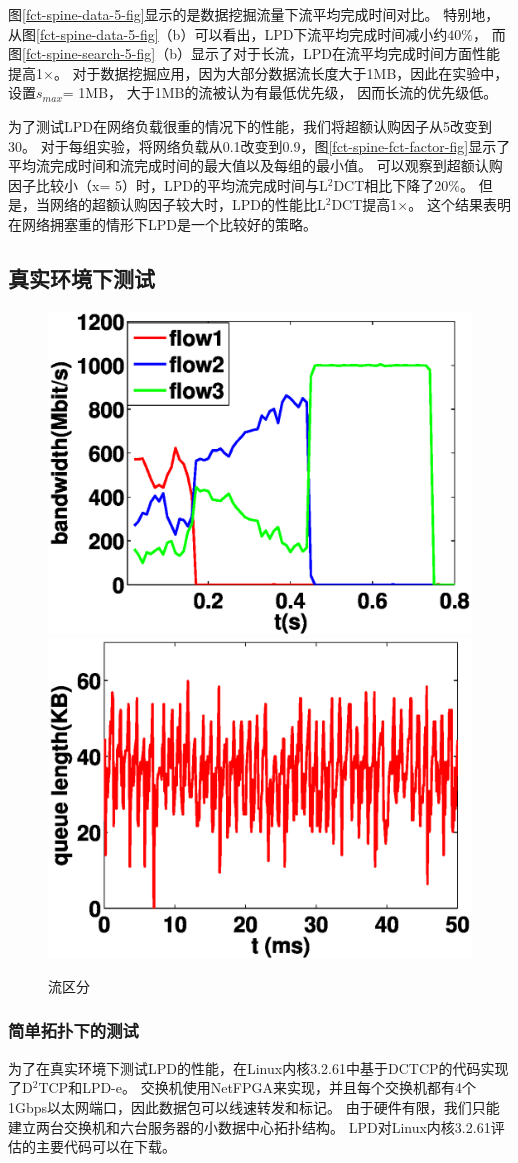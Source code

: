 图\ref{fct-spine-data-5-fig}显示的是数据挖掘流量下流平均完成时间对比。
特别地，从图\ref{fct-spine-data-5-fig}（b）可以看出，LPD下流平均完成时间减小约$40\%$，
而图\ref{fct-spine-search-5-fig}（b）显示了对于长流，LPD在流平均完成时间方面性能提高1$\times$。
对于数据挖掘应用，因为大部分数据流长度大于1MB，因此在实验中，设置$s_{max }$= 1MB，
大于1MB的流被认为有最低优先级，
因而长流的优先级低。

为了测试LPD在网络负载很重的情况下的性能，我们将超额认购因子从5改变到30。
对于每组实验，将网络负载从0.1改变到0.9，图\ref{fct-spine-fct-factor-fig}显示了平均流完成时间和流完成时间的最大值以及每组的最小值。
可以观察到超额认购因子比较小（x= 5）时，LPD的平均流完成时间与L$^2$DCT相比下降了$20\%$。
但是，当网络的超额认购因子较大时，LPD的性能比L$^2$DCT提高1$\times$。
这个结果表明在网络拥塞重的情形下LPD是一个比较好的策略。


\subsection{真实环境下测试}


\begin{figure}[h]
\centering
{}
 {\includegraphics[width=0.45\columnwidth]{figures/LPD/Realtest/realbandwidth2.eps}}
{\includegraphics[width=0.45\columnwidth]{figures/LPD/Realtest/realqueue2.eps}}
\caption{流区分}
\label{real-fig}
\end{figure}


\subsubsection{简单拓扑下的测试}
为了在真实环境下测试LPD的性能，在Linux内核3.2.61中基于DCTCP的代码实现了D$^2$TCP和LPD-e。
交换机使用NetFPGA来实现，并且每个交换机都有4个1Gbps以太网端口，因此数据包可以线速转发和标记。
由于硬件有限，我们只能建立两台交换机和六台服务器的小数据中心拓扑结构。
LPD对Linux内核3.2.61评估的主要代码可以在\cite{LPD-code}下载。


